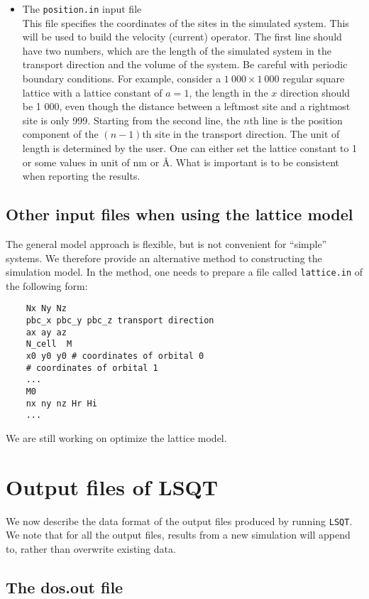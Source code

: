 \documentclass[12pt,a4paper]{report}
\begin{document}
\begin{itemize}
\item The \verb"position.in"  input file\\
This file specifies the coordinates of the sites in the simulated system. This will be used to build the velocity (current) operator. The first line should have two numbers, which are the length of the simulated system in the transport direction and the volume of the system. Be careful with periodic boundary conditions. For example, consider a $1~000 \times 1~000$ regular square lattice with a lattice constant of $a=1$, the length in the $x$ direction should be 1 000, even though the distance between a leftmost site and a rightmost site is only 999. Starting from the second line, the $n$th line is the position component of the $(n-1)$th site in the transport direction. The unit of length is determined by the user. One can either set the lattice constant to 1 or some values in unit of nm or \AA. What is important is to be consistent when reporting the results.
\end{itemize}

\subsection{Other input files when using the lattice model}

The general model approach is flexible, but is not convenient for ``simple'' systems. We therefore provide an alternative method to constructing the simulation model. In the method, one needs to prepare a file called \verb"lattice.in" of the following form:
\begin{verbatim}
    Nx Ny Nz
    pbc_x pbc_y pbc_z transport direction
    ax ay az
    N_cell  M
    x0 y0 y0 # coordinates of orbital 0
    # coordinates of orbital 1
    ...
    M0
    nx ny nz Hr Hi
    ...
\end{verbatim}

We are still working on optimize the lattice model. 

\section{Output files of LSQT}

We now describe the data format of the output files produced by running \verb"LSQT". We note that for all the output files, results from a new simulation will append to, rather than overwrite existing data.

\subsection{The dos.out file}
\end{document}
